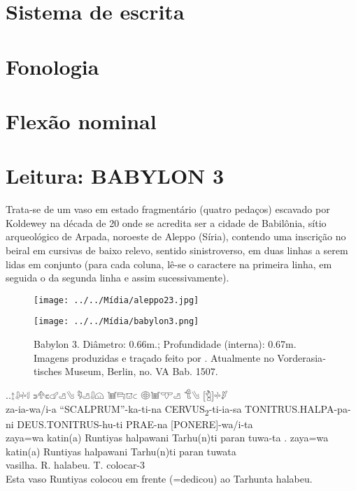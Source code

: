 \section{Sistema de escrita}

\lipsum[4]

\section{Fonologia}

\lipsum[3]

\section{Flexão nominal}

\lipsum[1]

\section{Leitura: BABYLON 3}

Trata-se de um vaso em estado fragmentário (quatro pedaços) escavado por
Koldewey na década de 20 onde se acredita ser a cidade de Babilônia, sítio
arqueológico de Arpada, noroeste de Aleppo (Síria), contendo uma inscrição no
beiral em cursivas de baixo relevo, sentido sinistroverso, em duas linhas a
serem lidas em conjunto (para cada coluna, lê-se o caractere na primeira linha,
em seguida o da segunda linha e assim sucessivamente).

\begin{figure}[ht!]
	\begin{center}
		\texttt{[image: ../../Mídia/aleppo23.jpg]}
	\end{center}
	\begin{center}
		\texttt{[image: ../../Mídia/babylon3.png]}
	\end{center}
	\caption{Babylon 3. Diâmetro: 0.66m.; Profundidade (interna): 0.67m. Imagens
		produzidas e traçado feito por \textcite[\emph{plate} 212]{CHLI_1_3}.
		Atualmente no \foreignlanguage{german}{Vorderasiatisches Museum}, Berlin, no. VA Bab. 1507.}\label{fig:babylon3}
\end{figure}

\ex.\ag.{\Large 𔖪𔓱𔗬𔗷} {\Large 𔗎𔔯𔗏𔗧𔑣𔐤} {\Large 𔑵𔑣𔓱𔗔} {\Large 𔓢𔑞𔕸𔗐} {\Large 𔖖𔓢𔕙𔑣}
{\Large 𔐎𔐤} {\Large [𔑇]𔗬𔑯}\\
za-ia-wa/i-a\hspace{10pt} ``SCALPRUM''-ka-ti-na\hspace{10pt}
CERVUS\textsubscript{2}-ti-ia-sa\hspace{10pt} TONITRUS.HALPA-pa-ni\hspace{10pt}
DEUS.TONITRUS-hu-ti\hspace{10pt} PRAE-na\hspace{10pt} [PONERE]-wa/i-ta\\
zaya=wa katin(a) Runtiyas halpawani Tarhu(n)ti paran tuwa-ta
\bg. zaya=wa katin(a) Runtiyas halpawani Tarhu(n)ti paran tuwata\\
\Det{}\Acu{} vasilha.\Neut{}\Acu{} R.\Com{}\Nom{} halabeu.\Dat{} T.\Dat{} \Prep{} colocar-3\Sg\\
Esta vaso Runtiyas colocou em frente (=dedicou) ao Tarhunta halabeu.

